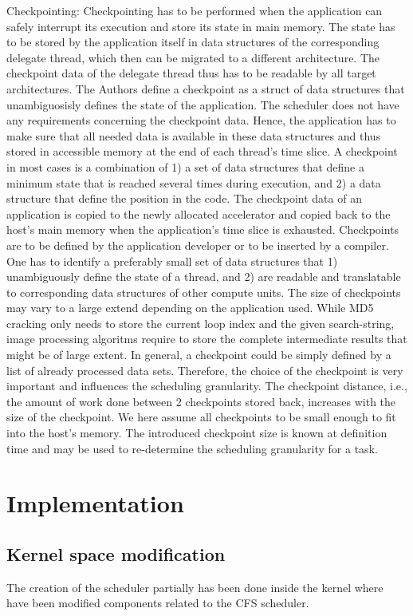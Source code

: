 \documentclass[a4paper,13pt]{article}
\begin{document}
\begin{multicols}{2}
Checkpointing: Checkpointing has to be performed when the application can safely interrupt its 
execution and store its state in main memory. The state has to be stored by the application itself
in data structures of the corresponding delegate thread, which then can be migrated to a different
architecture. The checkpoint data of the delegate thread thus has to be readable by all target 
architectures.
The Authors define a checkpoint as a struct of data structures that unambiguosisly defines the state of the 
application. The scheduler does not have any requirements concerning the checkpoint data. Hence, the
application has to make sure that all needed data is available in these data structures and thus
stored in accessible memory at the end of each thread's time slice. A checkpoint in most cases is a
combination of 1) a set of data structures that define a minimum state that is reached several times
during execution, and 2) a data structure that define the position in the code. The checkpoint data
of an application is copied to the newly allocated accelerator and copied back to the host's main 
memory when the application's time slice is exhausted. 
Checkpoints are to be defined by the application developer or to be inserted by a compiler. One has 
to identify a preferably small set of data structures that 1) unambiguously define the state of a 
thread, and 2) are readable and translatable to corresponding data structures of other compute units.
The size of checkpoints may vary to a large extend depending on the application used. While MD5\cite{rfc1321}\cite{oai:infoscience.epfl.ch:149727} 
cracking  only needs to store the current loop index and the given search-string, image processing 
algoritms require to store the complete intermediate results that might be of large extent.
In general, a checkpoint could be simply defined by a list of already processed data sets. Therefore,
the choice of the checkpoint is very important and influences the scheduling granularity. The 
checkpoint distance, i.e., the amount of work done between 2 checkpoints stored back, increases with
the size of the checkpoint.
We here assume all checkpoints to be small enough to fit into the host's memory. The introduced 
checkpoint size is known at definition time and may be used to re-determine the scheduling granularity
for a task. 

\section{Implementation}
\subsection{Kernel space modification}
The creation of the scheduler partially has been done inside the kernel where have been modified 
components related to the CFS scheduler.
\\


\end{multicols}
\end{document}
